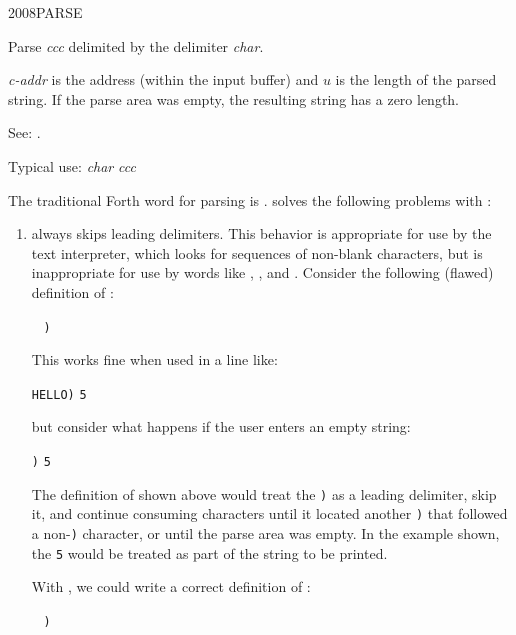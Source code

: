 \begin{newword}{2008}{PARSE}

	Parse \emph{ccc} delimited by the delimiter \emph{char}.

	\emph{c-addr} is the address (within the input buffer) and
	$u$ is the length of the parsed string. If the parse area
	was empty, the resulting string has a zero length.

\item[See:]
	.

	\begin{rationale} %
		Typical use: \emph{char}  \emph{ccc}

		The traditional Forth word for parsing is .
		 solves the following problems with :

		\begin{enumerate}
		\item {} always skips leading delimiters. This
			behavior is appropriate for use by the text interpreter,
			which looks for sequences of non-blank characters, but is
			inappropriate for use by words like  , ,
			and . Consider the following (flawed) definition
			of :

			\tab \word{:}  ~
				\word{[CHAR]} \texttt{)} ~
				  
			\word{;} ~ 

			This works fine when used in a line like:

			\tab {} \texttt{HELLO)} \quad \texttt{5} 

			but consider what happens if the user enters an empty
			string:

			\tab {} \texttt{)} \quad \texttt{5} 

			The definition of  shown above would treat the
			\texttt{)} as a leading delimiter, skip it, and continue
			consuming characters until it located another \texttt{)}
			that followed a non-\texttt{)} character, or until the
			parse area was empty. In the example shown, the
			\texttt{5} 
			would be treated as part of the string to be printed.

			With , we could write a correct definition of
			:

			\tab \word{:}  ~
				\word{[CHAR]} \texttt{)} ~
				 
			\word{;} ~ 


\end{enumerate}
\end{rationale}
\end{newword}
